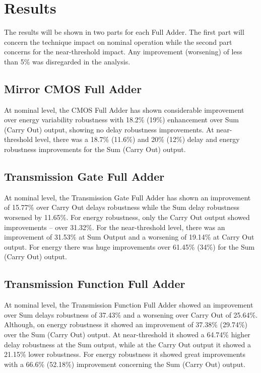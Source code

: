 \documentclass[ecp,tc, english]{iiufrgs}
\begin{document}
\chapter{Results}

The results will be shown in two parts for each Full Adder. The first part will concern the technique impact on nominal operation while the second part concerns for the near-threshold impact. Any improvement (worsening) of less than 5\% was disregarded in the analysis. 

\section{Mirror CMOS Full Adder}
At nominal level, the CMOS Full Adder has shown considerable improvement over energy variability robustness with 18.2\% (19\%) enhancement over Sum (Carry Out) output, showing no delay robustness improvements. At near-threshold level, there was a 18.7\% (11.6\%) and 20\% (12\%) delay and energy robustness improvements for the Sum (Carry Out) output. 

\section{Transmission Gate Full Adder}
At nominal level, the Transmission Gate Full Adder has shown an improvement of 15.77\% over Carry Out delays robustness while the Sum delay robustness worsened by 11.65\%. For energy robustness, only the Carry Out output showed improvements – over 31.32\%.
For the near-threshold level, there was an improvement of 31.53\% at Sum Output and a worsening of 19.14\% at Carry Out output. For energy there was huge improvements over 61.45\% (34\%) for the Sum (Carry Out) output.


\section{Transmission Function Full Adder}
At nominal level, the Transmission Function Full Adder showed an improvement over Sum delays robustness of 37.43\% and a worsening over Carry Out of 25.64\%. Although, on energy robustness it showed an improvement of 37.38\% (29.74\%) over the Sum (Carry Out) output. 
At near-threshold it showed a 64.74\% higher delay robustness at the Sum output, while at the Carry Out output it showed a 21.15\% lower robustness.  For energy robustness it showed great improvements with a 66.6\% (52.18\%) improvement concerning the Sum (Carry Out) output.
\end{document}
